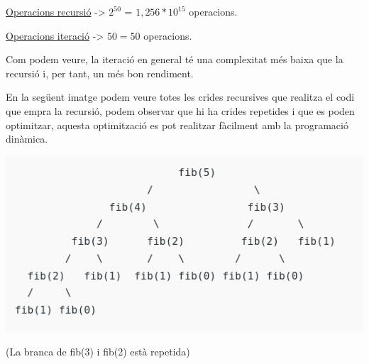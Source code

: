 \underline{Operacions recursió} -> $2^{50}$ = $1,256*10^{15}$ operacions. \newline

\underline{Operacions iteració} -> $50 = 50$ operacions. \newline

Com podem veure, la iteració en general té una complexitat més baixa que la recursió i, per tant, un més bon rendiment. \newline

En la següent imatge podem veure totes les crides recursives que realitza el codi que empra la recursió, podem observar que hi ha crides repetides i que es poden optimitzar, aquesta optimització es pot realitzar fàcilment amb la programació dinàmica. \newline

\begin{center}
\includegraphics[width=.9 \textwidth]{crides.png}
\end{center}

(La branca de fib(3) i fib(2) està repetida)

